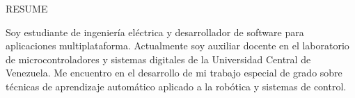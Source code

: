 \documentclass{resume} %
\begin{document}

\begin{rSection}{RESUME} %

    Soy estudiante de ingeniería eléctrica y desarrollador de software para aplicaciones multiplataforma. Actualmente soy auxiliar docente en el laboratorio de microcontroladores y sistemas digitales de la Universidad Central de Venezuela. Me encuentro en el desarrollo de mi trabajo especial de grado sobre técnicas de aprendizaje automático aplicado a la robótica y sistemas de control.


\end{rSection}

\end{document}
